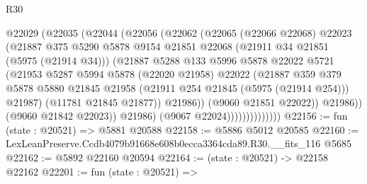 \begin{lexlean}{R30}
\begin{coremodule}
                            @22029
                              (@22035
                                (@22044
                                  (@22056
                                    (@22062
                                      (@22065
                                        (@22066 @22068)
                                        @22023
                                        (@21887
                                          @375
                                          @5290
                                          @5878
                                          @9154
                                          @21851
                                          @22068
                                          (@21911 @34 @21851 (@5975 (@21914 @34)))
                                          (@21887
                                            @5288
                                            @133
                                            @5996
                                            @5878
                                            @22022
                                            @5721
                                            (@21953
                                              @5287
                                              @5994
                                              @5878
                                              (@22020 @21958)
                                              @22022
                                              (@21887
                                                @359
                                                @379
                                                @5878
                                                @5880
                                                @21845
                                                @21958
                                                (@21911 @254 @21845 (@5975 (@21914 @254)))
                                                @21987)
                                              (@11781 @21845 @21877))
                                            @21986))
                                        (@9060 @21851 @22022))
                                      @21986))
                                  (@9060 @21842 @22023))
                                @21986)
                              (@9067 @22024))))))))))))))
@22156 := fun (state : @20521) => @5881 @20588
@22158 := @5886 @5012 @20585
@22160 := LexLeanPreserve.Ccdb4079b91668e608b0ecca3364cda89.R30.__fits_116 @5685
@22162 := @5892 @22160 @20594
@22164 := (state : @20521) -> @22158 @22162
@22201 := fun (state : @20521) =>

\end{coremodule}
\end{lexlean}
